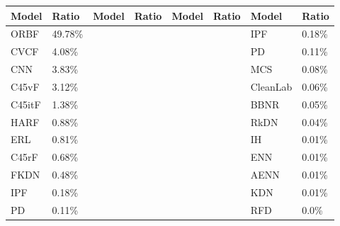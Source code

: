 \begin{tabular}{llllllll}
\toprule
 Model &  Ratio & Model & Ratio & Model & Ratio &    Model & Ratio \\
\midrule
  ORBF & 49.78\% &       &       &       &       &      IPF & 0.18\% \\
  CVCF &  4.08\% &       &       &       &       &       PD & 0.11\% \\
   CNN &  3.83\% &       &       &       &       &      MCS & 0.08\% \\
 C45vF &  3.12\% &       &       &       &       & CleanLab & 0.06\% \\
C45itF &  1.38\% &       &       &       &       &     BBNR & 0.05\% \\
  HARF &  0.88\% &       &       &       &       &     RkDN & 0.04\% \\
   ERL &  0.81\% &       &       &       &       &       IH & 0.01\% \\
 C45rF &  0.68\% &       &       &       &       &      ENN & 0.01\% \\
  FKDN &  0.48\% &       &       &       &       &     AENN & 0.01\% \\
   IPF &  0.18\% &       &       &       &       &      KDN & 0.01\% \\
    PD &  0.11\% &       &       &       &       &      RFD &  0.0\% \\
\bottomrule
\end{tabular}
